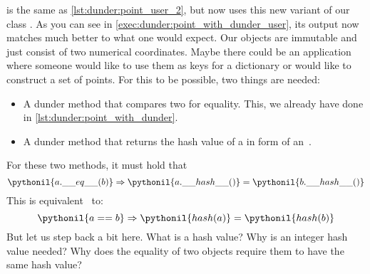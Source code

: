  is the same as \cref{lst:dunder:point_user_2}, but now uses this new variant of our class .
As you can see in \cref{exec:dunder:point_with_dunder_user}, its output now matches much better to what one would expect.%
%
\FloatBarrier%
\endhsection%
%
%
%
\label{sec:hashDunder}%
%
%
%
%
%
Our  objects are immutable and just consist of two numerical coordinates.
Maybe there could be an application where someone would like to use them as keys for a dictionary or would like to construct a set of points.
For this to be possible, two things are needed:%
%
\begin{itemize}%
%
\item A dunder method  that compares two  for equality. %
This, we already have done in \cref{lst:dunder:point_with_dunder}.%
%
\item A dunder method  that returns the hash value of a  in form of an~.%
%
\end{itemize}%
%
For these two methods, it must hold that~\cite{PSF2024OH}%
%
\begin{equation}%
\pythonil{a.\_\_eq\_\_(b)} \Rightarrow \pythonil{a.\_\_hash\_\_()} = \pythonil{b.\_\_hash\_\_()}%
\label{eq:eqAndHash1}%
\end{equation}%
%
This is equivalent~\cite{PSF2024BIE,PSF2024OH} to:%
%
\begin{equation}%
\pythonil{a == b} \Rightarrow \pythonil{hash(a)} = \pythonil{hash(b)}%
\label{eq:eqAndHash2}%
\end{equation}%
%
But let us step back a bit here.
What is a hash value?
Why is an integer hash value needed?
Why does the equality of two objects require them to have the same hash value?

